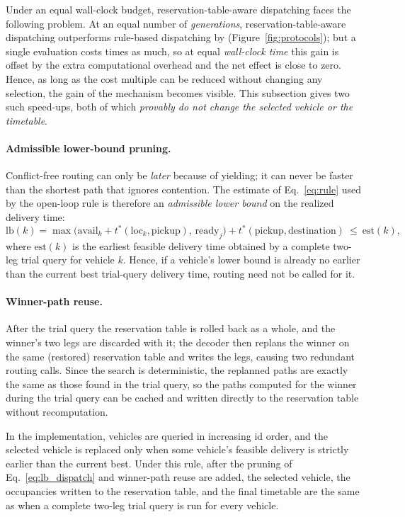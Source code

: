 Under an equal wall-clock budget, reservation-table-aware dispatching faces the following problem. At an equal number of \emph{generations}, reservation-table-aware dispatching outperforms rule-based dispatching by \GainProbeSameGen{} (Figure~\ref{fig:protocols});
but a single evaluation costs \CostMultBefore{} times as much, so at equal \emph{wall-clock time} this gain is offset by the extra computational overhead and the net effect is close to zero.
Hence, as long as the cost multiple can be reduced without changing any selection, the gain of the mechanism becomes visible. This subsection gives two such speed-ups, both of which \emph{provably do not change the selected vehicle or the timetable}.

\paragraph{Admissible lower-bound pruning.}
Conflict-free routing can only be \emph{later} because of yielding; it can never be faster than the shortest path that ignores contention. The estimate of Eq.~\eqref{eq:rule} used by the open-loop rule is therefore an \emph{admissible lower bound} on the realized delivery time:
\begin{equation}
\label{eq:lb_dispatch}
\mathrm{lb}(k)=\max\bigl(\mathrm{avail}_k+t^{*}(\mathrm{loc}_k,\text{pickup}),\,
\mathrm{ready}_j\bigr)+t^{*}(\text{pickup},\text{destination})\ \le\ \mathrm{est}(k),
\end{equation}
where $\mathrm{est}(k)$ is the earliest feasible delivery time obtained by a complete two-leg trial query for vehicle $k$.
Hence, if a vehicle's lower bound is already no earlier than the current best trial-query delivery time, routing need not be called for it.

\paragraph{Winner-path reuse.}
After the trial query the reservation table is rolled back as a whole, and the winner's two legs are discarded with it; the decoder then replans the winner on the same (restored) reservation table and writes the legs, causing two redundant routing calls.
Since the search is deterministic, the replanned paths are exactly the same as those found in the trial query, so the paths computed for the winner during the trial query can be cached and written directly to the reservation table without recomputation.

\begin{prop}
  \label{prop:speedup_equiv}
  In the implementation, vehicles are queried in increasing id order, and the selected vehicle is replaced only when some vehicle's feasible delivery is strictly earlier than the current best.
  Under this rule, after the pruning of Eq.~\eqref{eq:lb_dispatch} and winner-path reuse are added, the selected vehicle, the occupancies written to the reservation table, and the final timetable are the same as when a complete two-leg trial query is run for every vehicle.
\end{prop}

